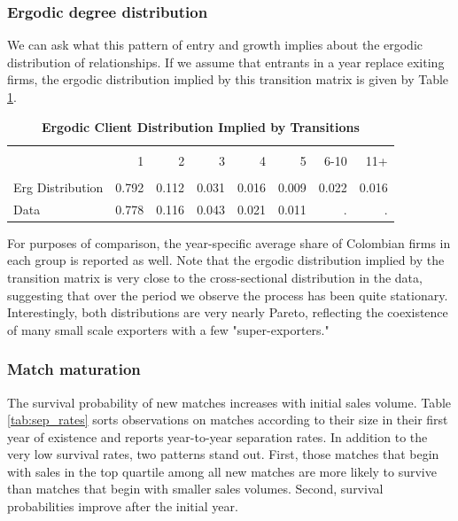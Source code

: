 \documentclass[12pt]{article}
\begin{document}
\subsubsection{Ergodic degree distribution}

We can ask what this pattern of entry and growth implies about the ergodic
distribution of relationships. If we assume that entrants in a year replace
exiting firms, the ergodic distribution implied by this transition matrix is
given by Table \ref{tab:erg_cli_dist}.

\begin{table}[bph]
\caption{\textbf{Ergodic Client Distribution Implied by Transitions}}
\label{tab:erg_cli_dist}\centering{\small \ } \centering
\begin{tabular}{l|rrrrrrr}
\hline\hline
&  &  &  &  &  &  &  \\[1px] 
& 1 & 2 & 3 & 4 & 5 & 6-10 & 11+ \\ \hline
&  &  &  &  &  &  &  \\[1px] 
Erg Distribution & 0.792 & 0.112 & 0.031 & 0.016 & 0.009 & 0.022 & 0.016 \\ 
Data & 0.778 & 0.116 & 0.043 & 0.021 & 0.011 & . & . \\ \hline
\end{tabular}
\end{table}

For purposes of comparison, the year-specific average share of Colombian
firms in each group is reported as well. Note that the ergodic distribution
implied by the transition matrix is very close to the cross-sectional
distribution in the data, suggesting that over the period we observe the
process has been quite stationary. Interestingly, both distributions are
very nearly Pareto, reflecting the coexistence of many small scale exporters
with a few "super-exporters."

\subsubsection{Match maturation}

The survival probability of new matches increases with initial sales volume.
Table \ref{tab:sep_rates} sorts observations on matches according to their
size in their first year of existence and reports year-to-year separation
rates. In addition to the very low survival rates, two patterns stand out.
First, those matches that begin with sales in the top quartile among all new
matches are more likely to survive than matches that begin with smaller
sales volumes. Second, survival probabilities improve after the initial year.
\end{document}
